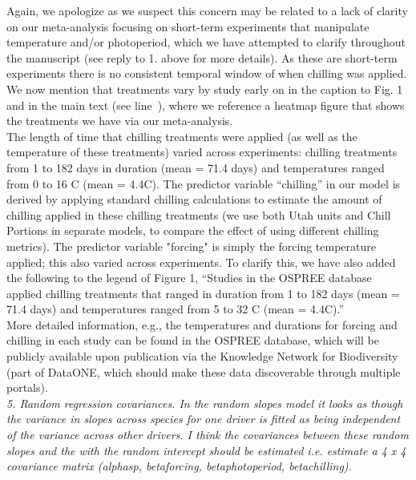 \documentclass[11pt, a4paper]{article}
\newcommand{\lr}[1]{line~\lineref{#1}}
\begin{document}
Again, we apologize as we suspect this concern may be related to a lack of clarity on our meta-analysis focusing on short-term experiments that manipulate temperature and/or photoperiod, which we have attempted to clarify throughout the manuscript (see reply to 1. above for more details). As these are short-term experiments there is no consistent temporal window of when chilling was applied. We now mention that treatments vary by study early on in the caption to Fig. 1 and in the main text (see \lr{heatmap}), where we reference a heatmap figure that shows the treatments we have via our meta-analysis.\\ 

The length of time that chilling treatments were applied (as well as the temperature of these treatments) varied across experiments: chilling treatments from 1 to 182 days in duration (mean = 71.4 days) and temperatures ranged from  0 to 16 \degree C (mean = 4.4\degree C). The predictor variable ``chilling'' in our model is derived by applying standard chilling calculations to estimate the amount of chilling applied in these chilling treatments (we use both Utah units and Chill Portions in separate models, to compare the effect of using different chilling metrics). The predictor variable "forcing" is simply the forcing temperature applied; this also varied across experiments. 
To clarify this, we have also added the following to the legend of Figure 1, ``Studies in the OSPREE database applied chilling treatments that ranged in duration from 1 to 182 days (mean = 71.4 days) and temperatures ranged from  5 to 32 \degree C (mean = 4.4\degree C).''\\

More detailed information, e.g., the temperatures and durations for forcing and chilling in each study can be found in the OSPREE database, which will be publicly available upon publication via the Knowledge Network for Biodiversity (part of DataONE, which should make these data discoverable through multiple portals). \\

\emph{5. Random regression covariances. In the random slopes model it looks as though the variance in
slopes across species for one driver is fitted as being independent of the variance across other
drivers. I think the covariances between these random slopes and the with the random
intercept should be estimated i.e. estimate a 4 x 4 covariance matrix (alphasp, betaforcing,
betaphotoperiod, betachilling).}\\
\end{document}
